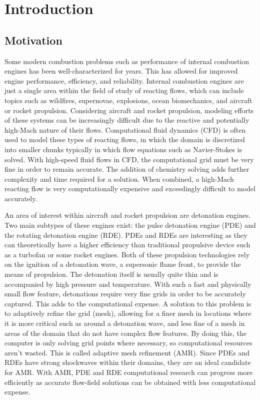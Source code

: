 \chapter{Introduction}
\label{introchap}

\section{Motivation}
Some modern combustion problems such as performance of internal combustion engines has been well-characterized for years. This has allowed for improved engine performance, efficiency, and reliability. Internal combustion engines are just a single area within the field of study of reacting flows, which can include topics such as wildfires, supernovae, explosions, ocean biomechanics, and aircraft or rocket propulsion. Considering aircraft and rocket propulsion, modeling efforts of these systems can be increasingly difficult due to the reactive and potentially high-Mach nature of their flows. Computational fluid dynamics (CFD) is often used to model these types of reacting flows, in which the domain is discretized into smaller chunks typically in which flow equations such as Navier-Stokes is solved. With high-speed fluid flows in CFD, the computational grid must be very fine in order to remain accurate. The addition of chemistry solving adds further complexity and time required for a solution. When combined, a high-Mach reacting flow is very computationally expensive and exceedingly difficult to model accurately. 

An area of interest within aircraft and rocket propulsion are detonation engines. Two main subtypes of these engines exist: the pulse detonation engine (PDE) and the rotating detonation engine (RDE). PDEs and RDEs are interesting as they can theoretically have a higher efficiency than traditional propulsive device such as a turbofan or some rocket engines. Both of these propulsion technologies rely on the ignition of a detonation wave, a supersonic flame front, to provide the means of propulsion. The detonation itself is usually quite thin and is accompanied by high pressure and temperature. With such a fast and physically small flow feature, detonations require very fine grids in order to be accurately captured. This adds to the computational expense. A solution to this problem is to adaptively refine the grid (mesh), allowing for a finer mesh in locations where it is more critical such as around a detonation wave, and less fine of a mesh in areas of the domain that do not have complex flow features. By doing this, the computer is only solving grid points where necessary, so computational resources aren't wasted. This is called adaptive mesh refinement (AMR). Since PDEs and RDEs have strong shockwaves within their domains, they are an ideal candidate for AMR. With AMR, PDE and RDE computational research can progress more efficiently as accurate flow-field solutions can be obtained with less computational expense. 

